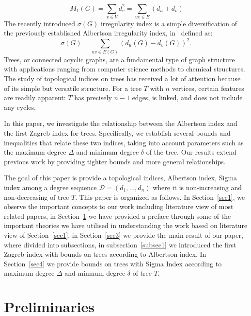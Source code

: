 \documentclass[12pt]{amsart}
\begin{document}
\begin{equation}~\label{eq3}
M_1(G) = \sum_{v \in V} d_v^2 = \sum_{uv \in E} (d_u + d_v)
\end{equation}
 The recently introduced $\sigma(G)$ irregularity index is a simple diversification of the previously established Albertson irregularity index, in~\cite{GutmanTogan,DimitrovAbdo} defined as: 
\[
\sigma(G)=\sum_{uv\in E(G)}\left( d_u(G)-d_v(G) \right)^2.
\]
Trees, or connected acyclic graphs, are a fundamental type of graph structure with applications ranging from computer science methods to chemical structures.  The study of topological indices on trees has received a lot of attention because of its simple but versatile structure.  For a tree $T$ with $n$ vertices, certain features are readily apparent:  $T$ has precisely $n-1$ edges, is linked, and does not include any cycles.\par 
In this paper, we investigate the relationship between the Albertson index and the first Zagreb index for trees. Specifically, we establish several bounds and inequalities that relate these two indices, taking into account parameters such as the maximum degree $\Delta$ and minimum degree $\delta$ of the tree. Our results extend previous work by providing tighter bounds and more general relationships.\par 
The goal of this paper is provide a topological indices, Albertson index, Sigma index among a degree sequence $\mathscr{D}=(d_1,\dots,d_n)$  where it is non-increasing and non-decreasing of tree $T$. This paper is organized as follows. In Section~\ref{sec1}, we observe the important concepts to our work including literature view of most related papers, in Section~\ref{sec2} we have provided a preface through some of the important theories we have utilised in understanding the work based on literature view of Section~\ref{sec1}, in Section~\ref{sec3} we provide the main result of our paper, where divided into subsections, in subsection~\ref{subsec1} we introduced the first Zagreb index with bounds on trees according to Albertson index. In Section~\ref{sec4}  we provide bounds on trees with Sigma Index according to maximum degree $\Delta$ and minmum degree $\delta$ of tree $T$. 

\section{Preliminaries}\label{sec2}
\end{document}
